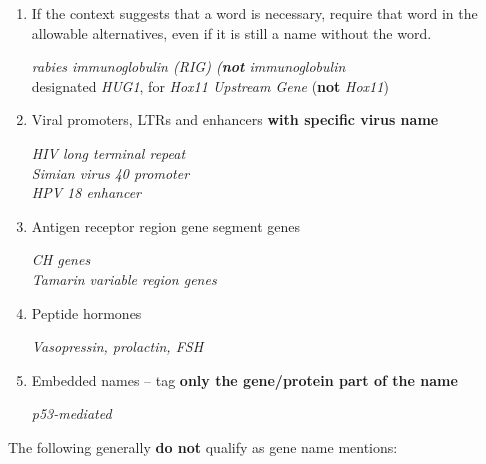 \begin{enumerate}
\item If the context suggests that a word is necessary, require that word in the allowable
alternatives, even if it is still a name without the word.

\emph{rabies immunoglobulin (RIG) (\textbf{not} \emph{immunoglobulin}}\\
designated \emph{HUG1}, for \emph{Hox11 Upstream Gene} (\textbf{not} \emph{Hox11})

\item Viral promoters, LTRs and enhancers \textbf{with specific virus name}

\emph{HIV long terminal repeat\\
Simian virus 40 promoter\\
HPV 18 enhancer}

\item Antigen receptor region gene segment genes

\emph{CH genes\\
Tamarin variable region genes}

\item Peptide hormones

\emph{Vasopressin, prolactin, FSH}

\item Embedded names – tag \textbf{only the gene/protein part of the name}

\emph{p53-mediated}

\end{enumerate}

The following generally \textbf{do not} qualify as gene name mentions:

